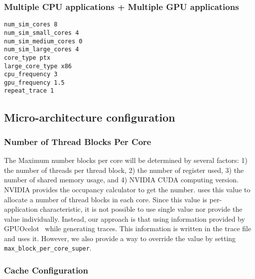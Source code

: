 \subsubsection{Multiple CPU applications + Multiple GPU applications}

\begin{Verbatim}
num_sim_cores 8
num_sim_small_cores 4
num_sim_medium_cores 0
num_sim_large_cores 4
core_type ptx
large_core_type x86
cpu_frequency 3
gpu_frequency 1.5
repeat_trace 1
\end{Verbatim}


\subsection{Micro-architecture configuration}

\subsubsection{Number of Thread Blocks Per Core}

The Maximum number blocks per core will be determined by several
factors: 1) the number of threads per thread block, 2) the number of
register used, 3) the number of shared memory usage, and 4) NVIDIA
CUDA computing version. NVIDIA provides the occupancy calculator to
get the number. \SIM uses this value to allocate a number of thread
blocks in each core. Since this value is per-application
characteristic, it is not possible to use single value nor provide the
value individually. Instead, our approach is that using information
provided by GPUOcelot~\cite{ocelot} while generating traces. This
information is written in the trace file and \SIM uses it. However, we
also provide a way to override the value by
setting \Verb+max_block_per_core_super+.



\subsubsection{Cache Configuration}

